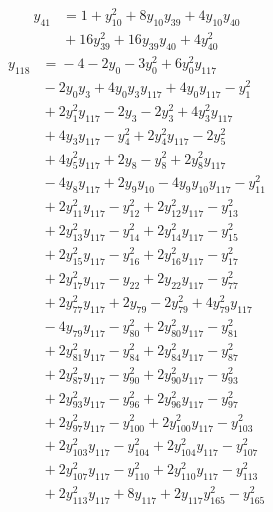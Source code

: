 \begin{align*}
y_{41} &={} 1 +y_{10}^{2} +8y_{10}y_{39} +4y_{10}y_{40} \\
 &{} +16y_{39}^{2} +16y_{39}y_{40} +4y_{40}^{2}
\end{align*}
\begin{align*}
y_{118} &={} -4 -2y_{0} -3y_{0}^{2} +6y_{0}^{2}y_{117} \\
 &{} -2y_{0}y_{3} +4y_{0}y_{3}y_{117} +4y_{0}y_{117} -y_{1}^{2} \\
 &{} +2y_{1}^{2}y_{117} -2y_{3} -2y_{3}^{2} +4y_{3}^{2}y_{117} \\
 &{} +4y_{3}y_{117} -y_{4}^{2} +2y_{4}^{2}y_{117} -2y_{5}^{2} \\
 &{} +4y_{5}^{2}y_{117} +2y_{8} -y_{8}^{2} +2y_{8}^{2}y_{117} \\
 &{} -4y_{8}y_{117} +2y_{9}y_{10} -4y_{9}y_{10}y_{117} -y_{11}^{2} \\
 &{} +2y_{11}^{2}y_{117} -y_{12}^{2} +2y_{12}^{2}y_{117} -y_{13}^{2} \\
 &{} +2y_{13}^{2}y_{117} -y_{14}^{2} +2y_{14}^{2}y_{117} -y_{15}^{2} \\
 &{} +2y_{15}^{2}y_{117} -y_{16}^{2} +2y_{16}^{2}y_{117} -y_{17}^{2} \\
 &{} +2y_{17}^{2}y_{117} -y_{22} +2y_{22}y_{117} -y_{77}^{2} \\
 &{} +2y_{77}^{2}y_{117} +2y_{79} -2y_{79}^{2} +4y_{79}^{2}y_{117} \\
 &{} -4y_{79}y_{117} -y_{80}^{2} +2y_{80}^{2}y_{117} -y_{81}^{2} \\
 &{} +2y_{81}^{2}y_{117} -y_{84}^{2} +2y_{84}^{2}y_{117} -y_{87}^{2} \\
 &{} +2y_{87}^{2}y_{117} -y_{90}^{2} +2y_{90}^{2}y_{117} -y_{93}^{2} \\
 &{} +2y_{93}^{2}y_{117} -y_{96}^{2} +2y_{96}^{2}y_{117} -y_{97}^{2} \\
 &{} +2y_{97}^{2}y_{117} -y_{100}^{2} +2y_{100}^{2}y_{117} -y_{103}^{2} \\
 &{} +2y_{103}^{2}y_{117} -y_{104}^{2} +2y_{104}^{2}y_{117} -y_{107}^{2} \\
 &{} +2y_{107}^{2}y_{117} -y_{110}^{2} +2y_{110}^{2}y_{117} -y_{113}^{2} \\
 &{} +2y_{113}^{2}y_{117} +8y_{117} +2y_{117}y_{165}^{2} -y_{165}^{2}
\end{align*}
